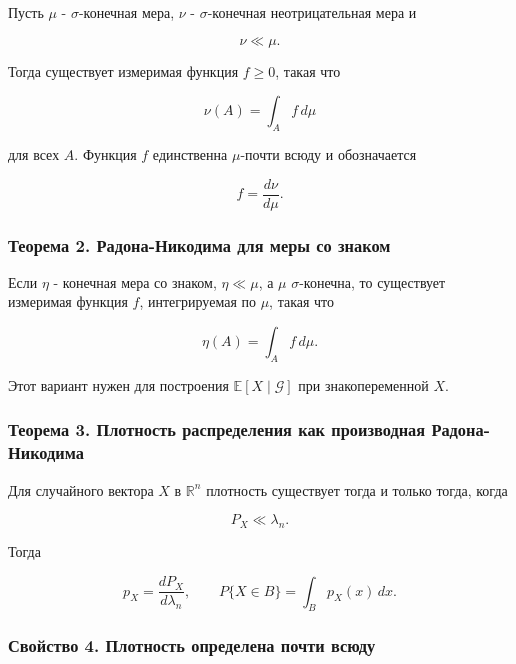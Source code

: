 \documentclass[
  11pt,
  a4paper,
]{article}
\begin{document}
Пусть \(\mu\) - \(\sigma\)-конечная мера, \(\nu\) - \(\sigma\)-конечная
неотрицательная мера и

\[
\nu\ll\mu.
\]

Тогда существует измеримая функция \(f\ge0\), такая что

\[
\nu(A)=\int_A f\,d\mu
\]

для всех \(A\). Функция \(f\) единственна \(\mu\)-почти всюду и
обозначается

\[
f=\frac{d\nu}{d\mu}.
\]

\subsubsection{Теорема 2. Радона-Никодима для меры со
знаком}\label{ux442ux435ux43eux440ux435ux43cux430-2.-ux440ux430ux434ux43eux43dux430-ux43dux438ux43aux43eux434ux438ux43cux430-ux434ux43bux44f-ux43cux435ux440ux44b-ux441ux43e-ux437ux43dux430ux43aux43eux43c}

Если \(\eta\) - конечная мера со знаком, \(\eta\ll\mu\), а \(\mu\)
\(\sigma\)-конечна, то существует измеримая функция \(f\), интегрируемая
по \(\mu\), такая что

\[
\eta(A)=\int_A f\,d\mu.
\]

Этот вариант нужен для построения \(\mathbb E[X\mid\mathcal G]\) при
знакопеременной \(X\).

\subsubsection{Теорема 3. Плотность распределения как производная
Радона-Никодима}\label{ux442ux435ux43eux440ux435ux43cux430-3.-ux43fux43bux43eux442ux43dux43eux441ux442ux44c-ux440ux430ux441ux43fux440ux435ux434ux435ux43bux435ux43dux438ux44f-ux43aux430ux43a-ux43fux440ux43eux438ux437ux432ux43eux434ux43dux430ux44f-ux440ux430ux434ux43eux43dux430-ux43dux438ux43aux43eux434ux438ux43cux430}

Для случайного вектора \(X\) в \(\mathbb R^n\) плотность существует
тогда и только тогда, когда

\[
P_X\ll\lambda_n.
\]

Тогда

\[
p_X=\frac{dP_X}{d\lambda_n},
\qquad
P\{X\in B\}=\int_B p_X(x)\,dx.
\]

\subsubsection{Свойство 4. Плотность определена почти
всюду}\label{ux441ux432ux43eux439ux441ux442ux432ux43e-4.-ux43fux43bux43eux442ux43dux43eux441ux442ux44c-ux43eux43fux440ux435ux434ux435ux43bux435ux43dux430-ux43fux43eux447ux442ux438-ux432ux441ux44eux434ux443}
\end{document}
